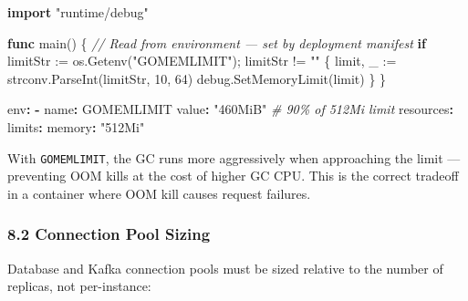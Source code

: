 \documentclass[
]{article}
\newenvironment{Shaded}{}{}
\newcommand{\AttributeTok}[1]{\textcolor[rgb]{0.49,0.56,0.16}{#1}}
\newcommand{\CommentTok}[1]{\textcolor[rgb]{0.38,0.63,0.69}{\textit{#1}}}
\newcommand{\ControlFlowTok}[1]{\textcolor[rgb]{0.00,0.44,0.13}{\textbf{#1}}}
\newcommand{\DecValTok}[1]{\textcolor[rgb]{0.25,0.63,0.44}{#1}}
\newcommand{\FunctionTok}[1]{\textcolor[rgb]{0.02,0.16,0.49}{#1}}
\newcommand{\KeywordTok}[1]{\textcolor[rgb]{0.00,0.44,0.13}{\textbf{#1}}}
\newcommand{\NormalTok}[1]{#1}
\newcommand{\OperatorTok}[1]{\textcolor[rgb]{0.40,0.40,0.40}{#1}}
\newcommand{\StringTok}[1]{\textcolor[rgb]{0.25,0.44,0.63}{#1}}
\begin{document}
\begin{Shaded}
\begin{Highlighting}[]
\KeywordTok{import} \StringTok{"runtime/debug"}

\KeywordTok{func}\NormalTok{ main}\OperatorTok{()} \OperatorTok{\{}
    \CommentTok{// Read from environment — set by deployment manifest}
    \ControlFlowTok{if}\NormalTok{ limitStr }\OperatorTok{:=}\NormalTok{ os}\OperatorTok{.}\NormalTok{Getenv}\OperatorTok{(}\StringTok{"GOMEMLIMIT"}\OperatorTok{);}\NormalTok{ limitStr }\OperatorTok{!=} \StringTok{""} \OperatorTok{\{}
\NormalTok{        limit}\OperatorTok{,}\NormalTok{ \_ }\OperatorTok{:=}\NormalTok{ strconv}\OperatorTok{.}\NormalTok{ParseInt}\OperatorTok{(}\NormalTok{limitStr}\OperatorTok{,} \DecValTok{10}\OperatorTok{,} \DecValTok{64}\OperatorTok{)}
\NormalTok{        debug}\OperatorTok{.}\NormalTok{SetMemoryLimit}\OperatorTok{(}\NormalTok{limit}\OperatorTok{)}
    \OperatorTok{\}}
\OperatorTok{\}}
\end{Highlighting}
\end{Shaded}

\begin{Shaded}
\begin{Highlighting}[]
\FunctionTok{env}\KeywordTok{:}
\KeywordTok{{-}}\AttributeTok{ }\FunctionTok{name}\KeywordTok{:}\AttributeTok{ GOMEMLIMIT}
\AttributeTok{  }\FunctionTok{value}\KeywordTok{:}\AttributeTok{ }\StringTok{"460MiB"}\CommentTok{  \# 90\% of 512Mi limit}
\FunctionTok{resources}\KeywordTok{:}
\AttributeTok{  }\FunctionTok{limits}\KeywordTok{:}
\AttributeTok{    }\FunctionTok{memory}\KeywordTok{:}\AttributeTok{ }\StringTok{"512Mi"}
\end{Highlighting}
\end{Shaded}

With \texttt{GOMEMLIMIT}, the GC runs more aggressively when approaching
the limit --- preventing OOM kills at the cost of higher GC CPU. This is
the correct tradeoff in a container where OOM kill causes request
failures.

\hypertarget{connection-pool-sizing}{%
\subsubsection{8.2 Connection Pool
Sizing}\label{connection-pool-sizing}}

Database and Kafka connection pools must be sized relative to the number
of replicas, not per-instance:
\end{document}
